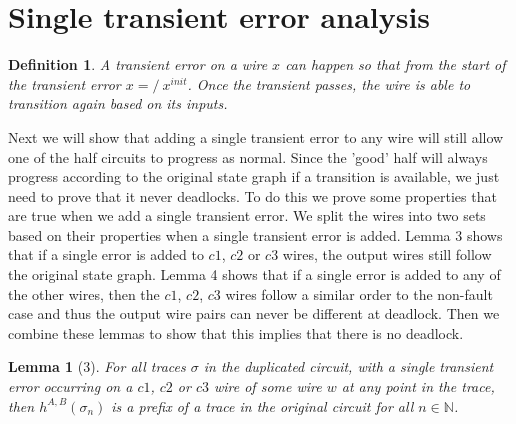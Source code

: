 \documentclass{article}
\newtheorem*{definition}{Definition}
\newtheorem*{lemma}{Lemma}
\begin{document}
\section{Single transient error analysis}
\begin{definition}A transient error on a wire $x$ can happen so that from the start of the transient error $x=/~x^{init}$.  Once the transient passes, the wire is able to transition again based on its inputs. %
\end{definition}
Next we will show that adding a single transient error to any wire will still allow one of the half circuits to progress as normal.  Since the 'good' half will always progress according to the original state graph if a transition is available, we just need to prove that it never deadlocks.  To do this we prove some properties that are true when we add a single transient error.  We split the wires into two sets based on their properties when a single transient error is added.  Lemma 3 shows that if a single error is added to $c1$, $c2$ or $c3$ wires, the output wires still follow the original state graph.  Lemma 4 shows that if a single error is added to any of the other wires, then the $c1$, $c2$, $c3$ wires follow a similar order to the non-fault case and thus the output wire pairs can never be different at deadlock.  Then we combine these lemmas to show that this implies that there is no deadlock.
\begin{lemma}[3]
For all traces $\sigma$ in the duplicated circuit, with a single transient error occurring on a $c1$, $c2$ or $c3$ wire of some wire $w$ at any point in the trace, then $h^{A,B}(\sigma_n)$ is a prefix of a trace in the original circuit for all $n \in \mathbb{N}$.
\end{lemma}
\end{document}
